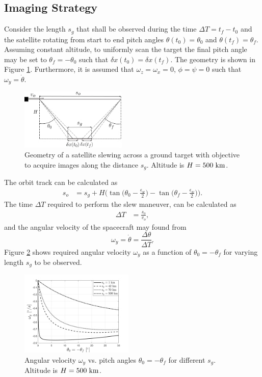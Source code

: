 \subsection{Imaging Strategy} 
Consider the length $s_{g}$ that shall be observed during the time $\Delta T=t_f-t_0$ and the satellite rotating from start to end pitch angles $\theta(t_0)=\theta_0$ and $\theta(t_f)=\theta_f$. Assuming constant altitude, to uniformly scan the target the final pitch angle may be set to $\theta_f=-\theta_0$ such that $\delta x(t_0)=\delta x (t_f)$. The geometry is shown in Figure \ref{fig:orbit-track}. Furthermore, it is assumed that $\omega_{z} = \omega_{x} = 0$, $\phi=\psi=0$ such that $\omega_y=\dot{\theta}$. 
\begin{figure}[htbp]
  \centering
      \includegraphics[width=0.45\textwidth]{figs/orbit_track.png}
  \caption{Geometry of a satellite slewing across a ground target with objective to acquire images along the distance $s_g$. Altitude is $H=500 \hspace{3pt} \rm{km}$.}
	\label{fig:orbit-track}
\end{figure}
The orbit track can be calculated as
\begin{align}
s_{o}&=s_{g}+H\Bigg(\tan\bigg(\theta_0-\frac{\epsilon_{w}}{2}\bigg)-\tan\bigg(\theta_f-\frac{\epsilon_{w}}{2}\bigg)\Bigg).
\end{align}
The time $\Delta T$ required to perform the slew maneuver, can be calculated as
\begin{align}
\Delta T & = \frac{s_{o}}{v_{o}},
\end{align}
and the angular velocity of the spacecraft may found from
\begin{equation}
\omega_{y}=\dot{\theta} = \frac{\Delta \theta}{\Delta T}.
\end{equation}
Figure \ref{fig:slew_angle} shows required angular velocity $\omega_y$ as a function of $\theta_0=-\theta_f$ for varying length $s_g$ to be observed.
\begin{figure}[htbp]
  \centering
      \includegraphics[width=0.48\textwidth]{figs/ang_vel_track.png}
  \caption{Angular velocity $\omega_{y}$ vs. pitch angles $\theta_0=-\theta_f$ for different $s_g$. Altitude is $H=500 \hspace{3pt} \rm{km}$.}
	\label{fig:slew_angle}
\end{figure}
